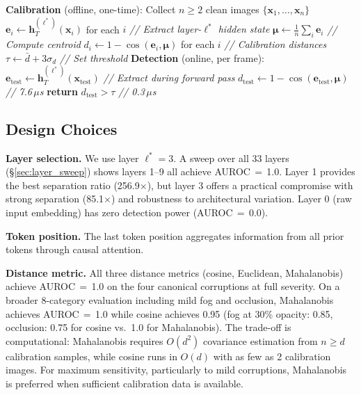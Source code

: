 \documentclass[11pt]{article}
\newcommand{\bx}{\mathbf{x}}
\newcommand{\be}{\mathbf{e}}
\newcommand{\bmu}{\boldsymbol{\mu}}
\newcommand{\bh}{\mathbf{h}}
\begin{document}
\begin{algorithm}[t]
\caption{Hidden-State OOD Detection for VLAs}
\label{alg:detection}
\begin{algorithmic}[1]
\STATE \textbf{Calibration} (offline, one-time):
\STATE \quad Collect $n \geq 2$ clean images $\{\bx_1, \ldots, \bx_n\}$
\STATE \quad $\be_i \leftarrow \bh^{(\ell^*)}_{T}(\bx_i)$ for each $i$ \hfill \textit{// Extract layer-$\ell^*$ hidden state}
\STATE \quad $\bmu \leftarrow \frac{1}{n}\sum_i \be_i$ \hfill \textit{// Compute centroid}
\STATE \quad $d_i \leftarrow 1 - \cos(\be_i, \bmu)$ for each $i$ \hfill \textit{// Calibration distances}
\STATE \quad $\tau \leftarrow \bar{d} + 3\sigma_d$ \hfill \textit{// Set threshold}
\STATE
\STATE \textbf{Detection} (online, per frame):
\STATE \quad $\be_\text{test} \leftarrow \bh^{(\ell^*)}_{T}(\bx_\text{test})$ \hfill \textit{// Extract during forward pass}
\STATE \quad $d_\text{test} \leftarrow 1 - \cos(\be_\text{test}, \bmu)$ \hfill \textit{// 7.6\,$\mu$s}
\STATE \quad \textbf{return} $d_\text{test} > \tau$ \hfill \textit{// 0.3\,$\mu$s}
\end{algorithmic}
\end{algorithm}

\subsection{Design Choices}
\label{sec:design}

\textbf{Layer selection.}
We use layer $\ell^* = 3$.
A sweep over all 33 layers (\S\ref{sec:layer_sweep}) shows layers 1--9 all achieve AUROC\,$=$\,1.0.
Layer 1 provides the best separation ratio (256.9$\times$), but layer 3 offers a practical compromise with strong separation (85.1$\times$) and robustness to architectural variation.
Layer 0 (raw input embedding) has zero detection power (AUROC\,$=$\,0.0).

\textbf{Token position.}
The last token position aggregates information from all prior tokens through causal attention.

\textbf{Distance metric.}
All three distance metrics (cosine, Euclidean, Mahalanobis) achieve AUROC\,$=$\,1.0 on the four canonical corruptions at full severity.
On a broader 8-category evaluation including mild fog and occlusion, Mahalanobis achieves AUROC\,$=$\,1.0 while cosine achieves 0.95 (fog at 30\% opacity: 0.85, occlusion: 0.75 for cosine vs.\ 1.0 for Mahalanobis).
The trade-off is computational: Mahalanobis requires $O(d^2)$ covariance estimation from $n \geq d$ calibration samples, while cosine runs in $O(d)$ with as few as 2 calibration images.
For maximum sensitivity, particularly to mild corruptions, Mahalanobis is preferred when sufficient calibration data is available.
\end{document}
